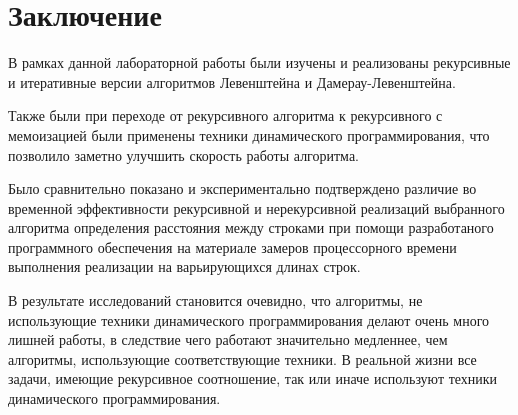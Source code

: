 \chapter*{Заключение}
В рамках данной лабораторной работы были изучены и реализованы рекурсивные и итеративные версии алгоритмов Левенштейна и Дамерау-Левенштейна.

Также были при переходе от рекурсивного алгоритма к рекурсивного с мемоизацией были применены техники динамического программирования, что позволило заметно улучшить скорость работы алгоритма.

Было сравнительно показано и экспериментально подтверждено различие во временной эффективности рекурсивной и нерекурсивной реализаций выбранного алгоритма определения расстояния между строками при помощи разработаного программного обеспечения на материале замеров процессорного времени выполнения реализации на варьирующихся длинах строк. 

В результате исследований становится очевидно, что алгоритмы, не использующие техники динамического программирования делают очень много лишней работы, в следствие чего работают значительно медленнее, чем алгоритмы, использующие соответствующие техники. В реальной жизни все задачи, имеющие рекурсивное соотношение, так или иначе используют техники динамического программирования.
